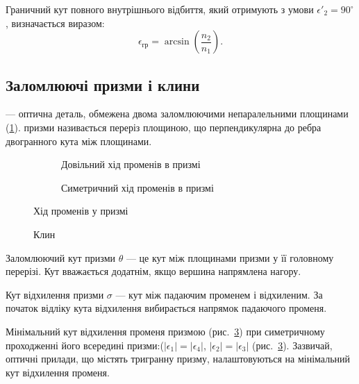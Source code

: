 Граничний кут
повного внутрішнього відбиття, який отримують з умови $\epsilon'_2 = 90^\circ$,
визначається виразом:
\begin{equation}\label{eq:total reflection}
	\epsilon_\text{гр} = \arcsin\left(\frac{n_2}{n_1}\right).
\end{equation}

\subsection*{Заломлюючі призми і клини}


 --- оптична деталь, обмежена двома заломлюючими непаралельними
площинами (\ref{pic:prism}).  призми називається переріз площиною, що перпендикулярна до ребра двогранного кута між площинами.

\begin{figure}[h!]\centering
    \begin{subfigure}{.47\linewidth}\centering
        
        \caption{Довільний хід променів в призмі}
        \label{pic:prism}
    \end{subfigure}
    \quad
    \begin{subfigure}{.47\linewidth}\centering
        
        \caption{Симетричний хід променів в призмі}
        \label{pic:prism_min}
    \end{subfigure}
    \caption{Хід променів у призмі}
\end{figure}



\begin{wrapfigure}{O}{0.33\linewidth}\centering
    
    \caption{Клин}
    \label{pic:klin}
\end{wrapfigure}
Заломлюючий кут призми $\theta$ --- це кут між площинами призми у її головному перерізі. Кут вважається додатнім, якщо вершина напрямлена нагору.

Кут відхилення призми  $\sigma$ --- кут між падаючим променем і відхиленим. За початок відліку кута відхилення вибирається напрямок падаючого променя.


Мінімальний кут відхилення променя призмою (рис.~\ref{pic:prism_min}) при
симетричному проходженні його всередині призми:($|\epsilon_1| = |\epsilon_4|$, $|\epsilon_2| = |\epsilon_3|$ (рис.~\ref{pic:prism_min}). Зазвичай, оптичні прилади, що містять тригранну призму, налаштовуються на мінімальний кут відхилення променя.

